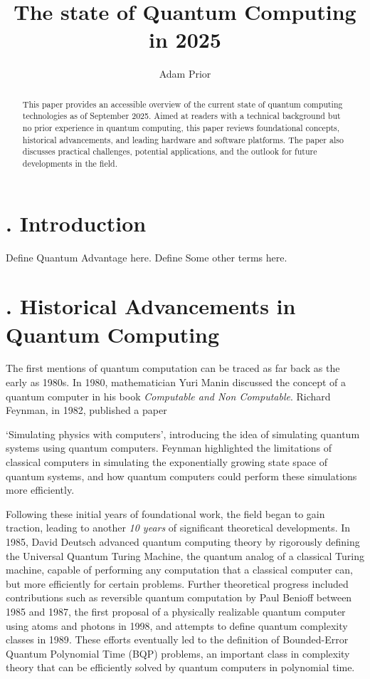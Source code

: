 \documentclass{elbioimp2}
\title{The state of Quantum Computing in 2025}
\author{Adam Prior\affiliation{UrbanFox, Dublin, Ireland}}
\begin{document}
\setcounter{secnumdepth}{2}


\maketitle

\begin{abstract}
This paper provides an accessible overview of the current state of quantum computing technologies as of September 2025. Aimed at readers with a technical background but no prior experience in quantum computing, this paper reviews foundational concepts, historical advancements, and leading hardware and software platforms. The paper also discusses practical challenges, potential applications, and the outlook for future developments in the field.
\end{abstract}

\section{. Introduction}
Define Quantum Advantage here.
Define Some other terms here.


\section{. Historical Advancements in Quantum Computing}
The first mentions of quantum computation can be traced as far back as the early as 1980s.
In 1980, mathematician Yuri Manin discussed the concept of a quantum computer in his book \textit{Computable and Non Computable}\cite{Manin1980}. Richard Feynman, in 1982, published a paper

`Simulating physics with computers', introducing the idea of simulating quantum systems using quantum computers\cite{Feynman1982}. Feynman highlighted the limitations of classical computers in simulating the exponentially growing state space of quantum systems, and how quantum computers could perform these simulations more efficiently.


Following these initial years of foundational work, the field began to gain traction, leading to another \textit{10 years} of significant theoretical developments. In 1985, David Deutsch advanced quantum computing theory by rigorously defining the Universal Quantum Turing Machine, the quantum analog of a classical Turing machine, capable of performing any computation that a classical computer can, but more efficiently for certain problems\cite{Deutsch1985}.
Further theoretical progress included contributions such as reversible quantum computation by Paul Benioff between 1985 and 1987\cite{benioff1986}, the first proposal of a physically realizable quantum computer using atoms and photons in 1998\cite{Igeta:88}, and attempts to define quantum complexity classes in 1989\cite{10.1145/167088.167097}. These efforts eventually led to the definition of Bounded-Error Quantum Polynomial Time (BQP) problems, an important class in complexity theory that can be efficiently solved by quantum computers in polynomial time.
\end{document}
